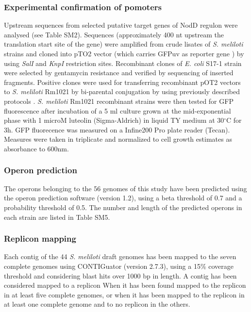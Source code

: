 \subsubsection{Experimental confirmation of pomoters}
Upstream sequences from selected putative target genes of NodD regulon were analysed (see Table SM2). Sequences (approximately 400 nt upstream the translation start site of the gene) were amplified from crude lisates of \textit{S. meliloti} strains and cloned into pTO2 vector (which carries GFPuv as reporter gene \cite{karunakaran2005family}) by using  \textit{SalI} and  \textit{KnpI} restriction sites. Recombinant clones of \textit{E. coli} S17-1 strain were selected by gentamycin resistance and verified by sequencing of inserted fragments. Positive clones were used for transferring recombinant pOT2 vectors to  \textit{S. meliloti} Rm1021 by bi-parental conjugation by using previously described protocols \cite{pini2014molecular}\cite{pini2013divj}. \textit{S. meliloti} Rm1021 recombinant strains were then tested for GFP fluorescence after incubation of a 5 ml culture grown at the mid-exponential phase with 1 microM luteolin (Sigma-Aldrich) in liquid TY medium at 30$^{\circ}$C for 3h. GFP fluorecence was measured on a Infine200 Pro plate reader (Tecan). Measures were taken in triplicate and normalized to cell growth estimates as absorbance to 600nm.

\subsubsection{Operon prediction}
The operons belonging to the 56 genomes of this study have been predicted using the operon prediction software (version 1.2)\cite{westover2005operon}, using a beta threshold of 0.7 and a probability threshold of 0.5. The number and length of the predicted operons in each strain are listed in Table SM5.

\subsubsection{Replicon mapping}
Each contig of the 44 \textit{S. meliloti} draft genomes has been mapped to the seven complete genomes using CONTIGuator (version 2.7.3)\cite{galardini2011contiguator}, using a 15\% coverage threshold and considering blast hits over 1000 bp in length. A contig has been considered mapped to a replicon When it has been found mapped to the replicon in at least five complete genomes, or when it has been mapped to the replicon in at least one complete genome and to no replicon in the others.

